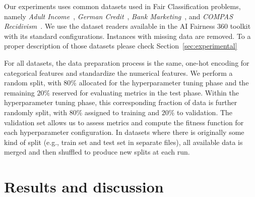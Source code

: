 Our experiments uses common datasets used in Fair Classification problems, namely \textit{Adult Income}~\citep{misc_adult_2}, \textit{German Credit}~\citep{misc_statlog_(german_credit_data)_144}, \textit{Bank Marketing}~\citep{misc_bank_marketing_222}, and \textit{COMPAS Recidivism}~\citep{misc_compas}. We use the dataset readers available in the AI Fairness 360 toolkit~\citep{aif360-oct-2018} with its standard configurations. Instances with missing data are removed. To a proper description of those datasets please check Section~\ref{sec:experimental}


For all datasets, the data preparation process is the same, one-hot encoding for categorical features and standardize the numerical features. We perform a random split, with $80\%$ allocated for the hyperparameter tuning phase and the remaining $20\%$ reserved for evaluating metrics in the test phase. Within the hyperparameter tuning phase, this corresponding fraction of data is further randomly split, with $80\%$ assigned to training and $20\%$ to validation. The validation set allows us to assess metrics and compute the fitness function for each hyperparameter configuration. In datasets where there is originally some kind of split (e.g., train set and test set in separate files), all available data is merged and then shuffled to produce new splits at each run.

\section{Results and discussion}
